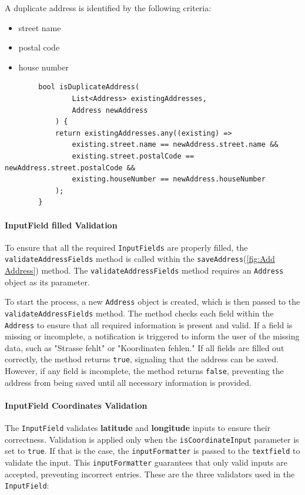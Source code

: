     A duplicate address is identified by the following criteria:
    \begin{itemize}
        \item street name
        \item postal code
        \item house number
    \end{itemize}

    \lstset{style=mycsharp, caption=isDuplicateAddress method}
    \begin{lstlisting}
        bool isDuplicateAddress(
                List<Address> existingAddresses,
                Address newAddress
            ) {
            return existingAddresses.any((existing) =>
                existing.street.name == newAddress.street.name &&
                existing.street.postalCode == newAddress.street.postalCode &&
                existing.houseNumber == newAddress.houseNumber
            );
        }
    \end{lstlisting}

\newpage

\paragraph{InputField filled Validation}
To ensure that all the required \texttt{InputFields} are properly filled, the \texttt{validateAddressFields} method is called within the \texttt{saveAddress}(\ref{fig:Add Address}) method. The \texttt{validateAddressFields} method requires an \texttt{Address} object as its parameter.

To start the process, a new \texttt{Address} object is created, which is then passed to the \texttt{validateAddressFields} method. The method checks each field within the \texttt{Address} to ensure that all required information is present and valid. If a field is missing or incomplete, a notification is triggered to inform the user of the missing data, such as "Strasse fehlt" or "Koordinaten fehlen." If all fields are filled out correctly, the method returns \texttt{true}, signaling that the address can be saved. However, if any field is incomplete, the method returns \texttt{false}, preventing the address from being saved until all necessary information is provided.



\paragraph{InputField Coordinates Validation}
\label{fig:InputField Coordinates Validation}
    The \texttt{InputField} validates \textbf{latitude} and \textbf{longitude} inputs to ensure their correctness. Validation is applied only when the \texttt{isCoordinateInput} parameter is set to \texttt{true}. If that is the case, the \texttt{inputFormatter} is passed to the \texttt{textfield} to validate the input. This \texttt{inputFormatter} guarantees that only valid inputs are accepted, preventing incorrect entries. These are the three validators used in the \texttt{InputField}:


